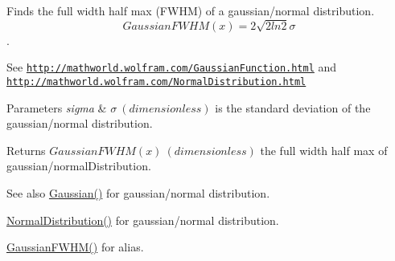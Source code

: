 Finds the full width half max (F\+W\+HM) of a gaussian/normal distribution. \[GaussianFWHM(x)=2\sqrt{2 ln 2} \sigma \]. 

See \href{http://mathworld.wolfram.com/GaussianFunction.html}{\tt http\+://mathworld.\+wolfram.\+com/\+Gaussian\+Function.\+html} and \href{http://mathworld.wolfram.com/NormalDistribution.html}{\tt http\+://mathworld.\+wolfram.\+com/\+Normal\+Distribution.\+html} 
\begin{DoxyParams}{Parameters}
{\em sigma} & $\sigma\ (dimensionless)$ is the standard deviation of the gaussian/normal distribution. \\
\hline
\end{DoxyParams}
\begin{DoxyReturn}{Returns}
$GaussianFWHM(x)\ (dimensionless)$ the full width half max of gaussian/normal\+Distribution. 
\end{DoxyReturn}
\begin{DoxySeeAlso}{See also}
\mbox{\hyperlink{group___g_x_math-_functions-_gaussian_ga647b46315081e299edc16a1c7f4e4032}{Gaussian()}} for gaussian/normal distribution. 

\mbox{\hyperlink{group___g_x_math-_functions-_gaussian_ga3747a7d047293d0e5310ba112bece627}{Normal\+Distribution()}} for gaussian/normal distribution. 

\mbox{\hyperlink{group___g_x_math-_functions-_gaussian_ga0b8be7b82cb82e871a2613e6a7180431}{Gaussian\+F\+W\+H\+M()}} for alias. 
\end{DoxySeeAlso}
